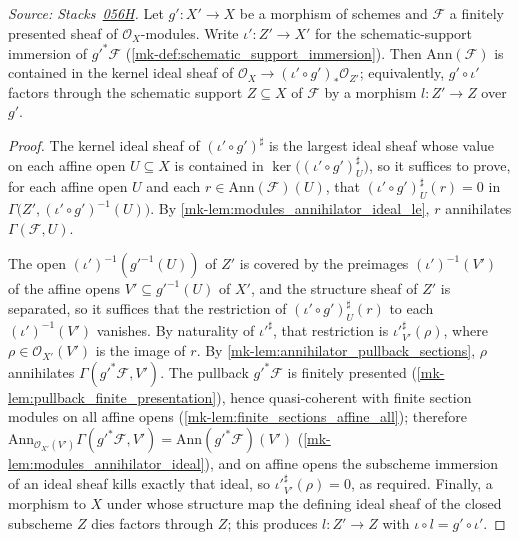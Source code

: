 \begin{lemma}\label{mk-lem:annihilator_le_map_pullback}
  \leanok

  \textit{Source:
  Stacks~\href{https://stacks.math.columbia.edu/tag/056H}{056H}.}
  Let \(g' : X' \to X\) be a morphism of schemes and \(\mathcal{F}\) a
  finitely presented sheaf of \(\mathcal{O}_X\)-modules.  Write
  \(\iota' : Z' \to X'\) for the schematic-support immersion of
  \(g'^* \mathcal{F}\) (\ref{mk-def:schematic_support_immersion}).  Then
  \(\mathrm{Ann}(\mathcal{F})\) is contained in the kernel ideal sheaf of
  \(\mathcal{O}_X \to (\iota' \circ g')_* \mathcal{O}_{Z'}\); equivalently,
  \(g' \circ \iota'\) factors through the schematic support
  \(Z \subseteq X\) of \(\mathcal{F}\) by a morphism \(l : Z' \to Z\) over
  \(g'\).
\end{lemma}
\begin{proof}
  \leanok{}
  The kernel ideal sheaf of \((\iota' \circ g')^\sharp\) is the largest ideal
  sheaf whose value on each affine open \(U \subseteq X\) is contained in
  \(\ker\bigl((\iota' \circ g')^\sharp_U\bigr)\), so it suffices to prove,
  for each affine open \(U\) and each \(r \in \mathrm{Ann}(\mathcal{F})(U)\),
  that \((\iota' \circ g')^\sharp_U(r) = 0\) in
  \(\Gamma\bigl(Z', (\iota' \circ g')^{-1}(U)\bigr)\).  By
  \ref{mk-lem:modules_annihilator_ideal_le}, \(r\) annihilates
  \(\Gamma(\mathcal{F}, U)\).

  The open \((\iota')^{-1}(g'^{-1}(U))\) of \(Z'\) is covered by the
  preimages \((\iota')^{-1}(V')\) of the affine opens
  \(V' \subseteq g'^{-1}(U)\) of \(X'\), and the structure sheaf of \(Z'\) is
  separated, so it suffices that the restriction of
  \((\iota' \circ g')^\sharp_U(r)\) to each \((\iota')^{-1}(V')\) vanishes.
  By naturality of \(\iota'^\sharp\), that restriction is
  \(\iota'^\sharp_{V'}(\rho)\), where \(\rho \in \mathcal{O}_{X'}(V')\) is the
  image of \(r\).  By \ref{mk-lem:annihilator_pullback_sections}, \(\rho\)
  annihilates \(\Gamma(g'^* \mathcal{F}, V')\).  The pullback
  \(g'^* \mathcal{F}\) is finitely presented
  (\ref{mk-lem:pullback_finite_presentation}), hence quasi-coherent with finite
  section modules on all affine opens
  (\ref{mk-lem:finite_sections_affine_all}); therefore
  \(\mathrm{Ann}_{\mathcal{O}_{X'}(V')}\Gamma(g'^* \mathcal{F}, V')
  = \mathrm{Ann}(g'^* \mathcal{F})(V')\)
  (\ref{mk-lem:modules_annihilator_ideal}), and on affine opens the subscheme
  immersion of an ideal sheaf kills exactly that ideal, so
  \(\iota'^\sharp_{V'}(\rho) = 0\), as required.  Finally, a morphism to
  \(X\) under whose structure map the defining ideal sheaf of the closed
  subscheme \(Z\) dies factors through \(Z\); this produces \(l : Z' \to Z\)
  with \(\iota \circ l = g' \circ \iota'\).
\end{proof}

